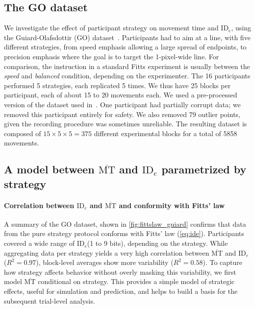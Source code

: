\documentclass[acmlarge, manuscript,review]{acmart}
\newcommand{\mmt}{\ensuremath{\overline{\mt}}\xspace}
\newcommand{\mt}{\ensuremath{{\text{MT}}}\xspace}
\newcommand{\ide}{\ensuremath{{\text{ID}_e}}\xspace}
\begin{document}
\subsection{The GO dataset}
We investigate the effect of participant strategy on movement time and \ide, using the Guiard-Olafsdottir (GO) dataset~\cite{guiard2011}.
Participants had to aim at a line, with five different strategies, from speed emphasis allowing a large spread of endpoints, to precision emphasis where the goal is to target the 1-pixel-wide line. 
For comparison, the instruction in a standard Fitts experiment is usually between the \textit{speed} and \textit{balanced} condition, depending on the experimenter.
The 16 participants performed 5 strategies, each replicated 5 times. We thus have 25 blocks per participant, each of about 15 to 20 movements each. 
We used a pre-processed version of the dataset used in~\cite{gori2020}. One participant had partially corrupt data; we removed this participant entirely for safety. We also removed 79 outlier points, given the recording procedure was sometimes unreliable. The resulting dataset is composed of $15 \times 5 \times 5 = 375$ different experimental blocks for a total of 5858 movements.




\subsection{A model between \mmt and \ide parametrized by strategy}

\paragraph{Correlation between \ide and \mmt and conformity with Fitts' law}
A summary of the GO dataset, shown in \autoref{fig:fittslaw_guiard} confirms that data from the pure strategy protocol conforms with Fitts' law (\autoref{eq:ide}). Participants covered a wide range of \ide (1 to 9 bits), depending on the strategy.
While aggregating data per strategy yields a very high correlation between \mmt and \ide ($R^2=0.97$), block-level averages show more variability ($R^2=0.58$).
To capture how strategy affects behavior without overly masking this variability, we first model \mmt conditional on strategy. This provides a simple model of strategic effects, useful for simulation and prediction, and helps to build a basis for the subsequent trial-level analysis.
\end{document}
